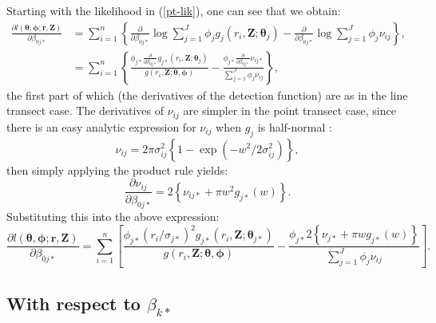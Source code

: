 Starting with the likelihood in (\ref{pt-lik}), one can see that we obtain:
\begin{align*}
\frac{\partial l(\bm{\theta}, \bm{\phi}; \mathbf{r},\mathbf{Z})}{\partial \beta_{0j*}}  &= \sum_{i=1}^n \left \{ \frac{\partial}{\partial \beta_{0j*}} \log \sum_{j=1}^J \phi_j g_j(r_i,\mathbf{Z}; \bm{\theta}_j) - \frac{\partial}{\partial \beta_{0j*}}\log \sum_{j=1}^J \phi_j \nu_{ij}\right \},\\
&= \sum_{i=1}^n \left \{ \frac{ \phi_{j*} \frac{\partial}{\partial \beta_{0j*}}  g_{j*} (r_i,\mathbf{Z}; \bm{\theta}_j)}{g(r_i,\mathbf{Z}; \bm{\theta}, \bm{\phi})} - \frac{ \phi_{j*}\frac{\partial}{\partial \beta_{0j*}}  \nu_{ij*} }{ \sum_{j=1}^J \phi_j \nu_{ij}}\right \},
\end{align*}
the first part of which (the derivatives of the detection function) are as in the line transect case. The derivatives of $\nu_{ij}$ are simpler in the point transect case, since there is an easy analytic expression for $\nu_{ij}$ when $g_j$ is half-normal :
\begin{equation*}
\nu_{ij} = 2 \pi \sigma_{ij}^2 \left \{ 1-\exp (-w^2/2\sigma_{ij}^2 ) \right \},
\end{equation*}
then simply applying the product rule yields:
\begin{equation*}
\frac{\partial \nu_{ij}}{\partial \beta_{0j*}} = 2 \left \{ \nu_{ij*} + \pi w^2 g_{j*}(w) \right \}.
\end{equation*}
Substituting this into the above expression:
\begin{equation*}
\frac{\partial l(\bm{\theta}, \bm{\phi}; \mathbf{r},\mathbf{Z})}{\partial \beta_{0j*}}  = \sum_{i=1}^n \left [ \frac{ \phi_{j*} (r_i/\sigma_{j*})^2 g_{j*}(r_i,\mathbf{Z}; \bm{\theta}_{j*})}{g(r_i,\mathbf{Z}; \bm{\theta}, \bm{\phi})} - \frac{ \phi_{j*} 2 \left \{ \nu_{j*} + \pi w g_{j*}(w) \right \} }{ \sum_{j=1}^J \phi_j \nu_{ij}}\right ].
\end{equation*}

\subsection{With respect to $\beta_{k*}$}

